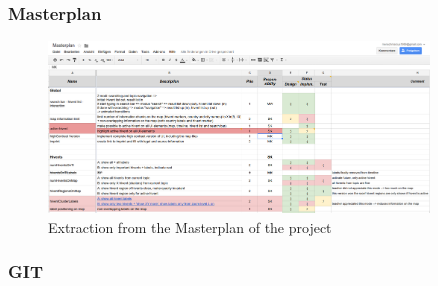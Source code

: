 
\subsubsection{Masterplan} %
\label{ssub:masterplan}

\begin{figure}[H]
  \begin{center}
    \includegraphics[width=0.9\textwidth]{graphics/Masterplan.png}
  \end{center}
  \caption{Extraction from the Masterplan of the project}
  \label{fig:masterplan}
\end{figure}


\subsubsection{GIT } %
\label{ssub:git_}


